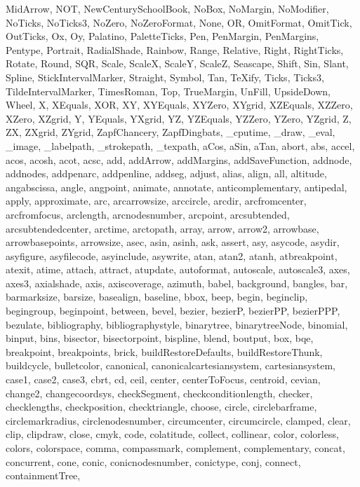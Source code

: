 {{  MidArrow, NOT, NewCenturySchoolBook, NoBox, NoMargin, NoModifier, NoTicks,
  NoTicks3, NoZero, NoZeroFormat, None, OR, OmitFormat, OmitTick, OutTicks,
  Ox, Oy, Palatino, PaletteTicks, Pen, PenMargin, PenMargins, Pentype,
  Portrait, RadialShade, Rainbow, Range, Relative, Right, RightTicks, Rotate,
  Round, SQR, Scale, ScaleX, ScaleY, ScaleZ, Seascape, Shift, Sin, Slant,
  Spline, StickIntervalMarker, Straight, Symbol, Tan, TeXify, Ticks, Ticks3,
  TildeIntervalMarker, TimesRoman, Top, TrueMargin, UnFill, UpsideDown,
  Wheel, X, XEquals, XOR, XY, XYEquals, XYZero, XYgrid, XZEquals, XZZero,
  XZero, XZgrid, Y, YEquals, YXgrid, YZ, YZEquals, YZZero, YZero, YZgrid, Z,
  ZX, ZXgrid, ZYgrid, ZapfChancery, ZapfDingbats, _cputime, _draw, _eval,
  _image, _labelpath, _strokepath, _texpath, aCos, aSin, aTan, abort, abs,
  accel, acos, acosh, acot, acsc, add, addArrow, addMargins, addSaveFunction,
  addnode, addnodes, addpenarc, addpenline, addseg, adjust, alias, align,
  all, altitude, angabscissa, angle, angpoint, animate, annotate,
  anticomplementary, antipedal, apply, approximate, arc, arcarrowsize,
  arccircle, arcdir, arcfromcenter, arcfromfocus, arclength, arcnodesnumber,
  arcpoint, arcsubtended, arcsubtendedcenter, arctime, arctopath, array,
  arrow, arrow2, arrowbase, arrowbasepoints, arrowsize, asec, asin, asinh,
  ask, assert, asy, asycode, asydir, asyfigure, asyfilecode, asyinclude,
  asywrite, atan, atan2, atanh, atbreakpoint, atexit, atime, attach, attract,
  atupdate, autoformat, autoscale, autoscale3, axes, axes3, axialshade, axis,
  axiscoverage, azimuth, babel, background, bangles, bar, barmarksize,
  barsize, basealign, baseline, bbox, beep, begin, beginclip, begingroup,
  beginpoint, between, bevel, bezier, bezierP, bezierPP, bezierPPP, bezulate,
  bibliography, bibliographystyle, binarytree, binarytreeNode, binomial,
  binput, bins, bisector, bisectorpoint, bispline, blend, boutput, box, bqe,
  breakpoint, breakpoints, brick, buildRestoreDefaults, buildRestoreThunk,
  buildcycle, bulletcolor, canonical, canonicalcartesiansystem,
  cartesiansystem, case1, case2, case3, cbrt, cd, ceil, center,
  centerToFocus, centroid, cevian, change2, changecoordsys, checkSegment,
  checkconditionlength, checker, checklengths, checkposition, checktriangle,
  choose, circle, circlebarframe, circlemarkradius, circlenodesnumber,
  circumcenter, circumcircle, clamped, clear, clip, clipdraw, close, cmyk,
  code, colatitude, collect, collinear, color, colorless, colors, colorspace,
  comma, compassmark, complement, complementary, concat, concurrent, cone,
  conic, conicnodesnumber, conictype, conj, connect, containmentTree,
}}

